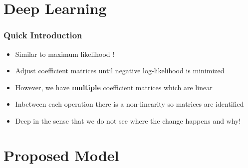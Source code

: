 \documentclass{article}
\begin{document}
\section{Deep Learning}
\frame{\sectionpage}
\begin{frame}
  \frametitle{Quick Introduction}
  \begin{itemize}
  \item Similar to maximum likelihood \citep[pp. 128f.]{goodfellow2016deep}!
  \item Adjust coefficient matrices until negative log-likelihood is minimized
  \item However, we have \textbf{multiple} coefficient matrices which are linear 
  \item Inbetween each operation there is a non-linearity so matrices are identified 
  \item Deep in the sense that we do not see where the change happens and why!
  \end{itemize}
\end{frame}


\section{Proposed Model}
\end{document}
